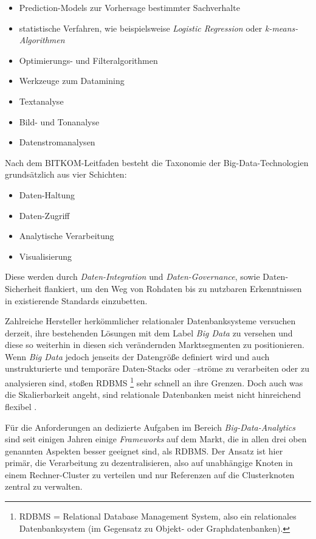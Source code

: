 \begin{itemize}
		\item Prediction-Models zur Vorhersage bestimmter Sachverhalte
		\item statistische Verfahren, wie beispielsweise \textit{Logistic Regression} oder \textit{k-means-Algorithmen} 
		\item Optimierungs- und Filteralgorithmen 
		\item Werkzeuge zum Datamining
		\item Textanalyse
		\item Bild- und Tonanalyse
		\item Datenstromanalysen
\end{itemize}	



Nach dem BITKOM-Leitfaden  besteht die Taxonomie der Big-Data-Technologien grundsätzlich aus vier Schichten:


\begin{itemize}
		\item Daten-Haltung
		\item Daten-Zugriff 
		\item Analytische Verarbeitung
		\item Visualisierung
\end{itemize}	


Diese werden durch \textit{Daten-Integration} und \textit{Daten-Governance}, sowie Daten-Sicherheit flankiert, um den Weg von Rohdaten bis zu nutzbaren Erkenntnissen in existierende Standards einzubetten.

Zahlreiche Hersteller herkömmlicher relationaler Datenbanksysteme versuchen derzeit, ihre bestehenden Lösungen mit dem Label \textit{Big Data} zu versehen und diese so weiterhin in diesen sich verändernden Marktsegmenten zu positionieren. Wenn \textit{Big Data} jedoch jenseits der Datengröße definiert wird und auch unstrukturierte und temporäre Daten-Stacks oder –ströme zu verarbeiten oder zu analysieren sind, stoßen RDBMS \footnote{RDBMS = Relational Database Management System, also ein relationales Datenbanksystem (im Gegensatz zu Objekt- oder Graphdatenbanken).} sehr schnell an ihre Grenzen. Doch auch was die Skalierbarkeit angeht, sind relationale Datenbanken meist nicht hinreichend flexibel . 

Für die Anforderungen an dedizierte Aufgaben im Bereich \textit{Big-Data-Analytics} sind seit einigen Jahren einige \textit{Frameworks} auf dem Markt, die in allen drei oben genannten Aspekten besser geeignet sind, als RDBMS. Der Ansatz ist hier primär, die Verarbeitung zu dezentralisieren, also auf unabhängige Knoten in einem Rechner-Cluster zu verteilen und nur Referenzen auf die Clusterknoten zentral zu verwalten.  

